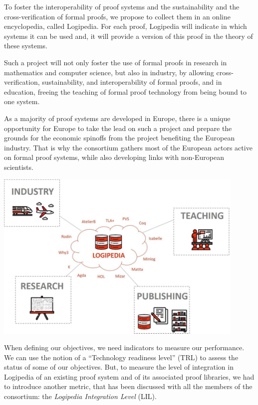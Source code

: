 To foster the interoperability of proof systems and the sustainability
and the cross-verification of formal proofs, we propose to collect
them in an online encyclopedia, called Logipedia.  For each proof,
Logipedia will indicate in which systems it can be used and, it will
provide a version of this proof in the theory of these systems.

Such a project will not only foster the use of formal proofs in
research in mathematics and computer science, but also in industry, by
allowing cross-verification, sustainability, and interoperability of
formal proofs, and in education, freeing the teaching of formal proof
technology from being bound to one system.

As a
majority of proof systems are developed in Europe, there is a unique
opportunity for Europe to take the lead on such a project and prepare
the grounds for the economic spinoffs from the project benefiting
the European industry. That is why the consortium gathers most of the
European actors active on formal proof systems, while also developing
links with non-European scientists.

\begin{center}
\includegraphics[width=12cm]{img/Schema-reduced}
\end{center}

When defining our objectives, we need indicators to measure our
performance.  We can use the notion of a ``Technology readiness level''
(TRL) to assess the status of some of our objectives.  But, to measure
the level of integration in Logipedia of an existing proof system and
of its associated proof libraries, we had to introduce another
metric, that has been discussed with all the members of the consortium:
the {\em Logipedia Integration Level} (LIL).


